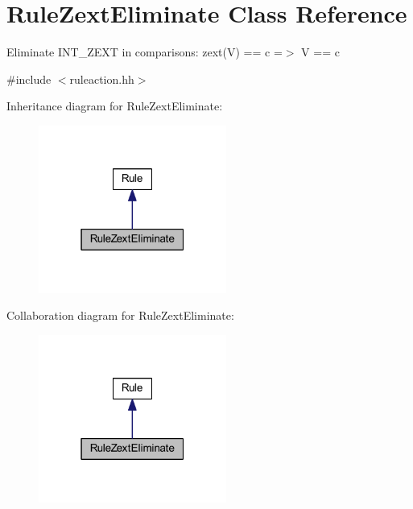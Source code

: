 \hypertarget{class_rule_zext_eliminate}{}\section{Rule\+Zext\+Eliminate Class Reference}
\label{class_rule_zext_eliminate}


Eliminate I\+N\+T\+\_\+\+Z\+E\+XT in comparisons\+: {\ttfamily zext(\+V) == c =$>$ V == c}  




{\ttfamily \#include $<$ruleaction.\+hh$>$}



Inheritance diagram for Rule\+Zext\+Eliminate\+:
\nopagebreak
\begin{figure}[H]
\begin{center}
\leavevmode
\includegraphics[width=175pt]{class_rule_zext_eliminate__inherit__graph}
\end{center}
\end{figure}


Collaboration diagram for Rule\+Zext\+Eliminate\+:
\nopagebreak
\begin{figure}[H]
\begin{center}
\leavevmode
\includegraphics[width=175pt]{class_rule_zext_eliminate__coll__graph}
\end{center}
\end{figure}

